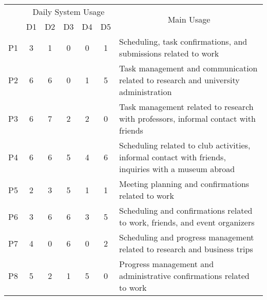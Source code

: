 \begin{table*}[t]
\begin{tabular}{ccccccl}
\hline
\multirow{2}{*}{} & \multicolumn{5}{c}{Daily System Usage} & \multicolumn{1}{c}{\multirow{2}{*}{Main Usage}}                                                      \\ \cline{2-6}
                  & D1     & D2    & D3    & D4    & D5    & \multicolumn{1}{c}{}                                                                                 \\ \hline
P1                & 3      & 1     & 0     & 0     & 1     & Scheduling, task confirmations, and submissions related to work                                      \\
P2                & 6      & 6     & 0     & 1     & 5     & Task management and communication related to research and university administration                  \\
P3                & 6      & 7     & 2     & 2     & 0     & Task management related to research with professors, informal contact with friends                   \\
P4                & 6      & 6     & 5     & 4     & 6     & Scheduling related to club activities, informal contact with friends, inquiries with a museum abroad \\
P5                & 2      & 3     & 5     & 1     & 1     & Meeting planning and confirmations related to work                                                   \\
P6                & 3      & 6     & 6     & 3     & 5     & Scheduling and confirmations related to work, friends, and event organizers                          \\
P7                & 4      & 0     & 6     & 0     & 2     & Scheduling and progress management related to research and business trips                            \\
P8                & 5      & 2     & 1     & 5     & 0     & Progress management and administrative confirmations related to work                                 \\ \hline
\end{tabular}

\end{table*}
